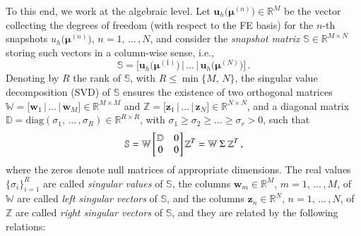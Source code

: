 \documentclass{elsarticle}
\theoremstyle{theorem}
\theoremstyle{definition}
\theoremstyle{remark}
\theoremstyle{proposition}
\numberwithin{figure}{section}
\newcommand{\bg}[1]{\boldsymbol{#1}}
\begin{document}
		To this end, we work at the algebraic level. Let $\mathbf{u}_h \big( \bg{\mu}^{(n)} \big) \in \mathbb{R}^M$ be the vector collecting the degrees of freedom (with respect to the FE basis) for the $n$-th snapshots $u_h \big( \bg{\mu}^{(n)} \big)$, $n = 1, \, \ldots \, , N$, and consider the \emph{snapshot matrix} $\mathbb{S} \in \mathbb{R}^{M \times N}$ storing such vectors in a column-wise sense, i.e.,
		\begin{equation*}
			\mathbb{S} = \big[ \mathbf{u}_h \big( \bg{\mu}^{(1)} \big) \, \big| \, \ldots \, \big| \, \mathbf{u}_h \big( \bg{\mu}^{(N)} \big) \big] \, .
		\end{equation*}
		Denoting by $R$ the rank of $\mathbb{S}$, with $R \leq \min \big\lbrace{ M, \, N \big\rbrace}$, the singular value decomposition (SVD) of $\mathbb{S}$ ensures the existence of two orthogonal matrices $\mathbb{W} = \big[ \mathbf{w}_1 \, \big| \, \ldots \, \big| \, \mathbf{w}_M \big] \in \mathbb{R}^{M \times M}$ and $\mathbb{Z} = \big[ \mathbf{z}_1 \, \big| \, \ldots \, \big| \, \mathbf{z}_N \big] \in \mathbb{R}^{N \times N}$, and a diagonal matrix $\mathbb{D} = \text{diag}(\sigma_1, \, \ldots \, , \sigma_R) \in \mathbb{R}^{R \times R}$, with $\sigma_1 \geq \sigma_2 \geq \ldots \geq \sigma_r > 0$, such that
		\begin{equation}
			\label{eq:svd}
			\mathbb{S} = \mathbb{W} 
			\begin{bmatrix}
			\hspace*{-0.15cm}
			\begin{array}{cc}
				\mathbb{D} & 0 \\
				0 & 0
			\end{array} 
			\hspace*{-0.15cm}
			\end{bmatrix}
			\mathbb{Z}^T = \mathbb{W} ~ \Sigma ~ \mathbb{Z}^T \, ,
		\end{equation}
		where the zeros denote null matrices of appropriate dimensions. The real values $\big\lbrace \sigma_i \big\rbrace_{i = 1}^R$ are called \emph{singular values} of $\mathbb{S}$, the columns $\mathbf{w}_m \in \mathbb{R}^M$, $m = 1, \, \ldots \, , M$, of $\mathbb{W}$ are called \emph{left singular vectors} of $\mathbb{S}$, and the columns $\mathbf{z}_n \in \mathbb{R}^N$, $n = 1, \, \ldots \, , N$, of $\mathbb{Z}$ are called \emph{right singular vectors} of $\mathbb{S}$, and they are related by the following relations:
\end{document}
